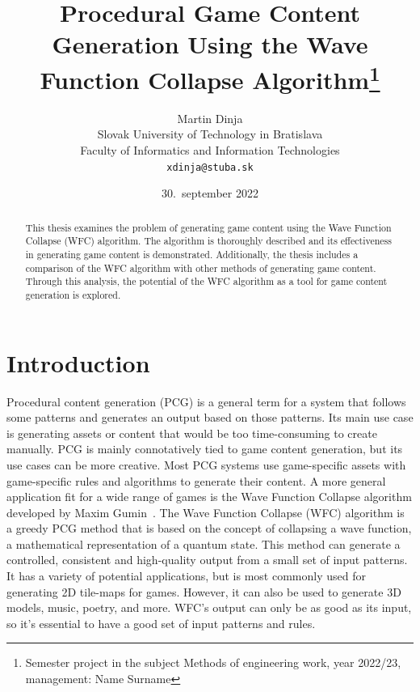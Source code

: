 \documentclass[10pt,oneside,a4paper]{article}
\title{Procedural Game Content Generation Using the Wave Function Collapse Algorithm\thanks{Semester project in the subject Methods of engineering work, year 2022/23, management: Name Surname}}
\author{Martin Dinja\\[2pt]
	{\small Slovak University of Technology in Bratislava}\\
	{\small Faculty of Informatics and Information Technologies}\\
	{\small \texttt{xdinja@stuba.sk}}
}
\date{\small 30.\ september 2022}
\begin{document}
\maketitle


\begin{abstract}
    \begin{center}
        This thesis examines the problem of generating game content using the Wave Function Collapse (WFC) algorithm.
        The algorithm is thoroughly described and its effectiveness in generating game content is demonstrated.
        Additionally, the thesis includes a comparison of the WFC algorithm with other methods of generating game content.
        Through this analysis, the potential of the WFC algorithm as a tool for game content generation is explored.
    \end{center}
\end{abstract}

\section{Introduction}\label{sec:introduction}

Procedural content generation (PCG) is a general term for a system that follows some patterns and generates an output based on those patterns.
Its main use case is generating assets or content that would be too time-consuming to create manually.
PCG is mainly connotatively tied to game content generation, but its use cases can be more creative.
Most PCG systems use game-specific assets with game-specific rules and algorithms to generate their content.
A more general application fit for a wide range of games is the Wave Function Collapse algorithm developed by Maxim Gumin~\cite{WFC}.
The Wave Function Collapse (WFC) algorithm is a greedy PCG method that is based on the concept of collapsing a wave function, a mathematical representation of a quantum state.
This method can generate a controlled, consistent and high-quality output from a small set of input patterns.
It has a variety of potential applications, but is most commonly used for generating 2D tile-maps for games.
However, it can also be used to generate 3D models, music, poetry, and more.
WFC's output can only be as good as its input, so it's essential to have a good set of input patterns and rules. 
\newpage
\end{document}
